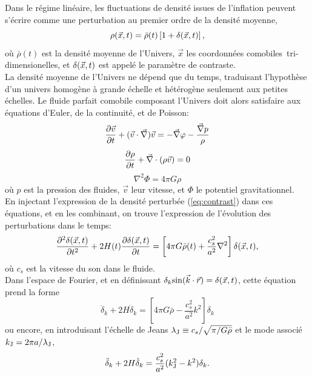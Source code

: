 Dans le régime linéaire, les fluctuations de densité issues de l'inflation peuvent s'écrire comme une perturbation au premier ordre de la densité moyenne,
\begin{equation}
    \label{eq:contrast}
    \rho(\vec{x}, t) = \bar{\rho}(t) \left[1 + \delta(\vec{x}, t) \right],
\end{equation}
où $\bar{\rho}(t)$ est la densité moyenne de l'Univers, $\vec{x}$ les coordonnées comobiles\footnotemark\ tri-dimensionelles, et $\delta(\vec{x}, t)$ est appelé le paramètre de contraste. \\
La densité moyenne de l'Univers ne dépend que du temps, traduisant l'hypothèse d'un univers homogène à grande échelle et hétérogène seulement aux petites échelles.
Le fluide parfait comobile composant l'Univers doit alors satisfaire aux équations d'Euler, de la continuité, et de Poisson:
\begin{equation}
    \frac{\partial \vec{v}}{\partial t} + (\vec{v} \cdot \vec{\nabla}) \vec{v} = -\vec{\nabla}\varphi - \frac{\vec{\nabla}p}{\rho} \label{eq:cosmo:euler}
\end{equation}
\begin{equation}
    \frac{\partial \rho}{\partial t} + \vec{\nabla} \cdot (\rho \vec{v}) = 0 \label{eq:cosmo:conti}
\end{equation}
\begin{equation}
    \nabla^2 \Phi = 4\pi G \rho \label{eq:cosmo:poisson}
\end{equation}
où $p$ est la pression des fluides, $\vec{v}$ leur vitesse, et $\Phi$ le potentiel gravitationnel. \\
En injectant l'expression de la densité perturbée (\ref{eq:contrast}) dans ces équations, et en les combinant, on trouve l'expression de l'évolution des perturbations dans le temps:
\begin{equation}
    \frac{\partial^2 \delta(\vec{x}, t)}{\partial t^2} + 2H(t)\frac{\partial \delta(\vec{x}, t)}{\partial t} = \left[4\pi G \bar{\rho}(t) + \frac{c_s^2}{a^2} \nabla^2\right] \delta(\vec{x}, t),
\end{equation}
où $c_s$ est la vitesse du son dans le fluide. \\
Dans l'espace de Fourier, et en définissant $\delta_k {\rm sin}(\vec{k}\cdot\vec{r}) = \delta(\vec{x}, t)$, cette équation prend la forme
\begin{equation}
    \ddot{\delta}_k + 2H\dot{\delta}_k = \left[4\pi G \bar{\rho} - \frac{c_s^2}{a^2} k^2\right] \delta_k
\end{equation}
ou encore, en introduisant l'échelle de Jeans $\lambda_{\rm J} \equiv c_s / \sqrt{\pi / G\bar{\rho}}$ et le mode associé $k_{\rm J} =2\pi a/\lambda_{\rm J}$, %
\begin{equation}
    \label{eq:cosmo:delta_k}
    \ddot{\delta}_k + 2H\dot{\delta}_k = \frac{c_s^2}{a^2} (k_{\rm J}^2 - k^2) \delta_k.
\end{equation}

